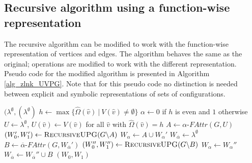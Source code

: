 \subsection{Recursive algorithm using a function-wise representation}
The recursive algorithm can be modified to work with the function-wise representation of vertices and edges. The algorithm behaves the same as the original; operations are modified to work with the different representation.  Pseudo code for the modified algorithm is presented in Algorithm \ref{alg_zlnk_UVPG}. Note that for this pseudo code no distinction is needed between explicit and symbolic representations of sets of configurations.
\begin{algorithm}
	\caption{$\textsc{RecursiveUPG}(\textit{unified parity game } G = (\\
		V : \hat{V} \rightarrow 2^\mathfrak{C},\\
		\hat{V}_0 \subseteq \hat{V},\\
		\hat{V}_1 \subseteq \hat{V},\\
		E : \hat{E} \rightarrow 2^\mathfrak{C},\\
		\hat{\Omega} : \hat{V}\rightarrow \mathbb{N}))$}\label{alg_zlnk_UVPG}
	\begin{algorithmic}[1]
		\State \Return $(\lambda^\emptyset, (\lambda^\emptyset)$
		\EndIf
		\State $h \gets \max\{ \hat{\Omega}(\hat{v})\ |\ V(\hat{v}) \neq \emptyset \}$
		\State $\alpha \gets 0$ if $h$ is even and $1$ otherwise
		\State $U \gets \lambda^\emptyset$, $U(\hat{v}) \gets V(\hat{v})$ for all $\hat{v}$ with $\hat{\Omega}(\hat{v}) = h$
		\State $A \gets \alpha\textit{-FAttr}(G, U)$
		\State $(W_0', W_1') \gets \textsc{RecursiveUPG}(G \backslash A)$
		\State $W_\alpha \gets A \cup W_\alpha'$
		\State $W_{\overline{\alpha}} \gets \lambda^\emptyset$
		\Else
		\State $B \gets \overline{\alpha}\textit{-FAttr}(G,W_{\overline{\alpha}}')$
		\State $(W_0'', W_1'') \gets \textsc{RecursiveUPG}(G \backslash B)$
		\State $W_\alpha \gets W_\alpha''$
		\State $W_{\overline{\alpha}} \gets W_{\overline{\alpha}}'' \cup B$
		\EndIf
		\State \Return $(W_0, W_1)$
	\end{algorithmic}
\end{algorithm}

